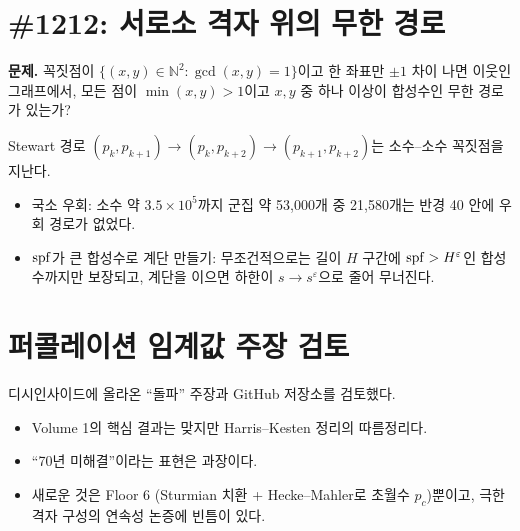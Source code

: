 \documentclass[11pt]{article}
\begin{document}
\section{\Erdos{} \#1212: 서로소 격자 위의 무한 경로}
\textbf{문제.} 꼭짓점이 $\{(x,y)\in\mathbb N^2:\gcd(x,y)=1\}$이고 한 좌표만 $\pm1$ 차이 나면 이웃인 그래프에서, 모든 점이 $\min(x,y)>1$이고 $x,y$ 중 하나 이상이 합성수인 무한 경로가 있는가?

Stewart 경로 $(p_k,p_{k+1})\to(p_k,p_{k+2})\to(p_{k+1},p_{k+2})$는 소수–소수 꼭짓점을 지난다.
\begin{itemize}[nosep]
\item 국소 우회: 소수 약 $3.5\times10^5$까지 군집 약 53{,}000개 중 21{,}580개는 반경 40 안에 우회 경로가 없었다.
\item $\operatorname{spf}$가 큰 합성수로 계단 만들기: 무조건적으로는 길이 $H$ 구간에 $\operatorname{spf}>H^{\varepsilon}$인 합성수까지만 보장되고, 계단을 이으면 하한이 $s\to s^{\varepsilon}$으로 줄어 무너진다.
\end{itemize}

\section{퍼콜레이션 임계값 주장 검토}
디시인사이드에 올라온 ``돌파'' 주장과 GitHub 저장소를 검토했다.
\begin{itemize}[nosep]
\item Volume 1의 핵심 결과는 맞지만 Harris–Kesten 정리의 따름정리다.
\item ``70년 미해결''이라는 표현은 과장이다.
\item 새로운 것은 Floor 6 (Sturmian 치환 + Hecke–Mahler로 초월수 $p_c$)뿐이고, 극한 격자 구성의 연속성 논증에 빈틈이 있다.
\end{itemize}






\end{document}
